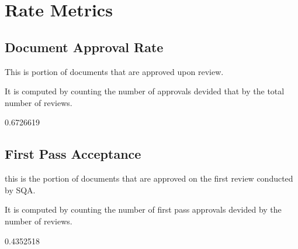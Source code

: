 \documentclass{article}
\begin{document}
\section{Rate Metrics}
\subsection{Document Approval Rate}
This is portion of documents that are approved upon review.

It is computed by counting the number of approvals devided that by the total number of reviews.

\begin{Schunk}
\begin{Soutput}
[1] 0.6726619
\end{Soutput}
\end{Schunk}

\subsection{First Pass Acceptance}
this is the portion of documents that are approved on the first review conducted
by SQA.

It is computed by counting the number of first pass approvals devided by
the number of reviews.

\begin{Schunk}
\begin{Soutput}
[1] 0.4352518
\end{Soutput}
\end{Schunk}
\end{document}
